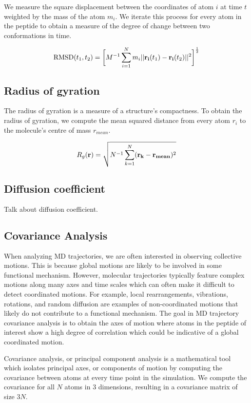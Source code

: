 We measure the square displacement between the coordinates of atom $i$ at time $t$ weighted by the mass of the atom $m_i$. We iterate this process for every atom in the peptide to obtain a measure of the degree of change between two conformations in time.

\begin{equation}
\text{RMSD}(t_1, t_2) = \bigg[ M^{-1} \sum_{i=1}^{N} m_{i} \lvert \lvert \mathbf{r_{i}}(t_{1}) - \mathbf{r_{i}}(t_{2}) \rvert \rvert^2 \bigg]^\frac{1}{2}
\end{equation}


\subsection{Radius of gyration}

The radius of gyration is a measure of a structure's compactness. To obtain the radius of gyration, we compute the mean squared distance from every atom $r_i$ to the molecule's centre of mass $r_{mean}$.

\begin{equation}
R_g(\mathbf{r}) = \sqrt{N^{-1} \sum_{k=1}^{N} (\mathbf{r_k} - \mathbf{r_{mean}})^2}
\end{equation}

\subsection{Diffusion coefficient}
Talk about diffusion coefficient.

\subsection{Covariance Analysis}

When analyzing MD trajectories, we are often interested in observing collective motions. This is because global motions are likely to be involved in some functional mechanism. However, molecular trajectories typically feature complex motions along many axes and time scales which can often make it difficult to detect coordinated motions. For example, local rearrangements, vibrations, rotations, and random diffusion are examples of non-coordinated motions that likely do not contribute to a functional mechanism. The goal in MD trajectory covariance analysis is to obtain the axes of motion where atoms in the peptide of interest show a high degree of correlation which could be indicative of a global coordinated motion. 

Covariance analysis, or principal component analysis is a mathematical tool which isolates principal axes, or components of motion by computing the covariance between atoms at every time point in the simulation. We compute the covariance for all $N$ atoms in $3$ dimensions, resulting in a covariance matrix of size $3N$.

